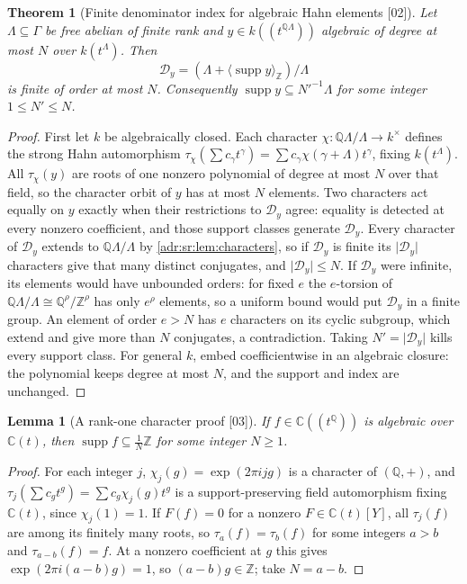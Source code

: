\documentclass[11pt,letterpaper]{article}
\numberwithin{equation}{section}
\newtheorem{theorem}{Theorem}[section]
\newtheorem{lemma}[lemma]{Lemma}
\theoremstyle{definition}
\theoremstyle{remark}
\newcommand{\C}{\mathbb C}
\newcommand{\Q}{\mathbb Q}
\newcommand{\Z}{\mathbb Z}
\newcommand{\supp}{\operatorname{supp}}
\newcommand{\abs}[1]{\lvert#1\rvert}
\newcommand{\src}[1]{\textup{[#1]}}%
\begin{document}
\begin{theorem}[Finite denominator index for algebraic Hahn elements \src{02}]
\label{adr:sr:thm:denominators}
Let $\Lambda\subseteq\Gamma$ be free abelian of finite rank and
$y\in k((t^{\Q\Lambda}))$ algebraic of degree at most $N$ over $k(t^\Lambda)$.
Then
\[
 \mathcal D_y=(\Lambda+\langle\supp y\rangle_\Z)/\Lambda
\]
is finite of order at most $N$. Consequently $\supp y\subseteq N'^{-1}\Lambda$
for some integer $1\le N'\le N$.
\end{theorem}
\begin{proof}
First let $k$ be algebraically closed. Each character
$\chi:\Q\Lambda/\Lambda\to k^\times$ defines the strong Hahn automorphism
$\tau_\chi(\sum c_\gamma t^\gamma)=\sum c_\gamma\chi(\gamma+\Lambda)t^\gamma$,
fixing $k(t^\Lambda)$. All $\tau_\chi(y)$ are roots of one nonzero polynomial
of degree at most $N$ over that field, so the character orbit of $y$ has at
most $N$ elements. Two characters act equally on $y$ exactly when their
restrictions to $\mathcal D_y$ agree: equality is detected at every nonzero
coefficient, and those support classes generate $\mathcal D_y$. Every
character of $\mathcal D_y$ extends to $\Q\Lambda/\Lambda$ by
\cref{adr:sr:lem:characters}, so if $\mathcal D_y$ is finite its
$\abs{\mathcal D_y}$ characters give that many distinct conjugates, and
$\abs{\mathcal D_y}\le N$. If $\mathcal D_y$ were infinite, its elements would
have unbounded orders: for fixed $e$ the $e$-torsion of
$\Q\Lambda/\Lambda\cong\Q^\rho/\Z^\rho$ has only $e^\rho$ elements, so a uniform
bound would put $\mathcal D_y$ in a finite group. An element of order $e>N$
has $e$ characters on its cyclic subgroup, which extend and give more than $N$
conjugates, a contradiction. Taking $N'=\abs{\mathcal D_y}$ kills every support
class. For general $k$, embed coefficientwise in an algebraic closure: the
polynomial keeps degree at most $N$, and the support and index are unchanged.
\end{proof}

\begin{lemma}[A rank-one character proof \src{03}]
\label{adr:sr:lem:denominators}
If $f\in\C((t^\Q))$ is algebraic over $\C(t)$, then
$\supp f\subseteq\frac1N\Z$ for some integer $N\ge1$.
\end{lemma}
\begin{proof}
For each integer $j$, $\chi_j(g)=\exp(2\pi ijg)$ is a character of $(\Q,+)$,
and $\tau_j(\sum c_gt^g)=\sum c_g\chi_j(g)t^g$ is a support-preserving field
automorphism fixing $\C(t)$, since $\chi_j(1)=1$. If $F(f)=0$ for a nonzero
$F\in\C(t)[Y]$, all $\tau_j(f)$ are among its finitely many roots, so
$\tau_a(f)=\tau_b(f)$ for some integers $a>b$ and $\tau_{a-b}(f)=f$. At a
nonzero coefficient at $g$ this gives $\exp(2\pi i(a-b)g)=1$, so
$(a-b)g\in\Z$; take $N=a-b$.
\end{proof}
\end{document}
